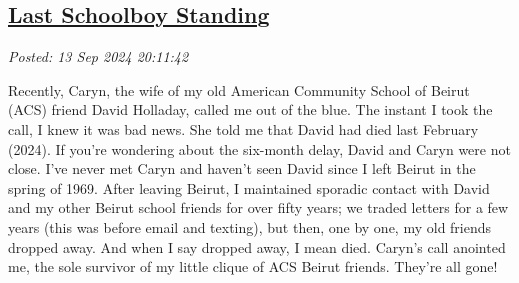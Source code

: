 %
%
%
%
%

\subsection*{\href{http://analyzethedatanotthedrivel.org/2024/09/13/last-schoolboy-standing/}{Last Schoolboy Standing}}


\noindent\emph{Posted: 13 Sep 2024 20:11:42}
\vspace{6pt}

Recently, Caryn, the wife of my old American Community School of Beirut
(ACS) friend David Holladay, called me out of the blue. The instant I
took the call, I knew it was bad news. She told me that David had died
last February (2024). If you're wondering about the six-month delay,
David and Caryn were not close. I've never met Caryn and haven't seen
David since I left Beirut in the spring of 1969. After leaving Beirut, I
maintained sporadic contact with David and my other Beirut school
friends for over fifty years; we traded letters for a few years (this
was before email and texting), but then, one by one, my old friends
dropped away. And when I say dropped away, I mean died. Caryn's call
anointed me, the sole survivor of my little clique of ACS Beirut
friends. They're all gone!

